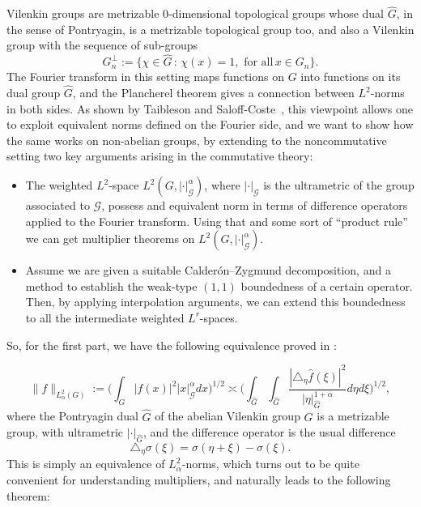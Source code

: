 \documentclass[12pt, reqno]{amsart}
\newcommand{\1}{\mathds{1}}
\begin{document}
Vilenkin groups are metrizable $0$-dimensional topological groups whose dual $\widehat{G}$, in the sense of Pontryagin, is a metrizable topological group too, and also a Vilenkin group with the sequence of sub-groups $$ G_n^\bot:= \{ \chi \in \widehat{G} \, : \, \chi(x)=1, \, \, \text{for all} \, x \in G_n  \}.$$ 
The Fourier transform in this setting maps functions on \(G\) into functions on its dual group \(\widehat{G}\), and the Plancherel theorem gives a connection between $L^2$-norms in both sides. As shown by Taibleson and Saloff-Coste~\cite{SaloffCoste1986, Taibleson1970}, this viewpoint allows one to exploit equivalent norms defined on the Fourier side, and we want to show how the same works on non-abelian groups, by extending to the noncommutative setting two key arguments arising in the commutative theory:

\begin{itemize}
    \item[(i)] The weighted $L^2$-space $L^2 (G, |\cdot|_{\mathcal{G}}^\alpha)$, where $|\cdot|_{\mathcal{G}}$ is the ultrametric of the group associated to $\mathcal{G}$, possess and equivalent norm in terms of difference operators applied to the Fourier transform. Using that and some sort of “product rule” we can get multiplier theorems on $L^2 (G, |\cdot|_{\mathcal{G}}^\alpha)$.
    \item[(ii)] Assume we are given a suitable Calderón--Zygmund decomposition, and a method to establish the weak-type \((1,1)\) boundedness of a certain operator. Then, by applying interpolation arguments, we can extend this boundedness to all the intermediate weighted \(L^{r}\)-spaces.
\end{itemize}

So, for the first part, we have the following equivalence proved in \cite{SaloffCoste1986}:

$$\|f\|_{L^2_\alpha(G)} := \Big( \int_{G} |f(x)|^2 |x|^\alpha_{\mathcal{G}} dx \Big)^{1/2} \asymp \Big( \int_{\widehat{G}} \int_{\widehat{G}} \frac{|\triangle_\eta \widehat{f}(\xi)|^2}{|\eta|^{1+\alpha}_{\widehat{G}}}  d\eta d \xi  \Big)^{1/2},$$where the Pontryagin dual $\widehat{G}$ of the abelian Vilenkin group $G$ is a metrizable group, with ultrametric $|\cdot|_{\widehat{G}}$, and the difference operator is the usual difference
\[
\triangle_\eta \sigma(\xi) = \sigma(\eta + \xi) - \sigma(\xi).
\]This is simply an equivalence of $L^2_\alpha$-norms, which turns out to be quite convenient for understanding multipliers,
and naturally leads to the following theorem: 
 
\end{document}
